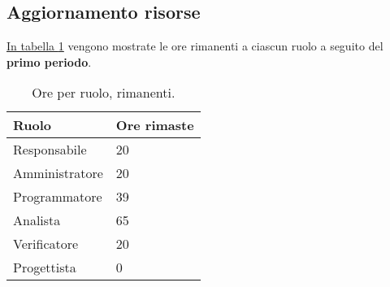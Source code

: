 \subsection{Aggiornamento risorse}

\label{sec:AggiornamentoRisorse_PrimoPeriodo}



\hyperref[tab:risorse_rimaste_primo_periodo]{In tabella \ref{tab:risorse_rimaste_primo_periodo}} vengono mostrate le ore rimanenti a ciascun ruolo a seguito del \textbf{primo periodo}.
\begin{table}[!h]
    \centering
    \begin{tabular}{| l | l |}
    \hline
        \textbf{Ruolo} & 
        \textbf{Ore rimaste}\\
    \hline
        Responsabile & 20\\
    \hline
        Amministratore & 20\\
    \hline
        Programmatore & 39\\
    \hline
        Analista & 65\\
    \hline
        Verificatore & 20\\
    \hline
        Progettista & 0\\
    \hline
    \end{tabular}
    \caption{Ore per ruolo, rimanenti.}
    \label{tab:risorse_rimaste_primo_periodo} 
\end{table}